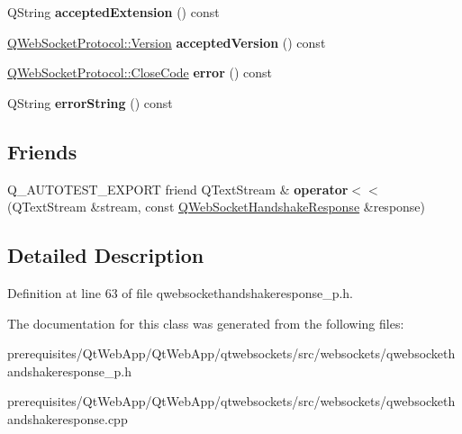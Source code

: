 \begin{DoxyCompactItemize}
Q\+String {\bfseries accepted\+Extension} () const
\item 
\mbox{\label{class_q_web_socket_handshake_response_adb698b5e0072760d49c9b8ee8c89b75c}} 
\mbox{\hyperlink{namespace_q_web_socket_protocol_ad53f2684577effe0a517eadb48714df3}{Q\+Web\+Socket\+Protocol\+::\+Version}} {\bfseries accepted\+Version} () const
\item 
\mbox{\label{class_q_web_socket_handshake_response_a0c9c739fba884d8b31b8d5c88ea2beec}} 
\mbox{\hyperlink{namespace_q_web_socket_protocol_a9f236676f594451d8d723f260b71028c}{Q\+Web\+Socket\+Protocol\+::\+Close\+Code}} {\bfseries error} () const
\item 
\mbox{\label{class_q_web_socket_handshake_response_a807a9235ade54a4c28b7bea45a1fa463}} 
Q\+String {\bfseries error\+String} () const
\end{DoxyCompactItemize}
\subsection*{Friends}
\begin{DoxyCompactItemize}
\item 
\mbox{\label{class_q_web_socket_handshake_response_a8b2b358b0fd11d33e7c340d4669d85d3}} 
Q\+\_\+\+A\+U\+T\+O\+T\+E\+S\+T\+\_\+\+E\+X\+P\+O\+RT friend Q\+Text\+Stream \& {\bfseries operator$<$$<$} (Q\+Text\+Stream \&stream, const \mbox{\hyperlink{class_q_web_socket_handshake_response}{Q\+Web\+Socket\+Handshake\+Response}} \&response)
\end{DoxyCompactItemize}


\subsection{Detailed Description}


Definition at line 63 of file qwebsockethandshakeresponse\+\_\+p.\+h.



The documentation for this class was generated from the following files\+:\begin{DoxyCompactItemize}
\item 
prerequisites/\+Qt\+Web\+App/\+Qt\+Web\+App/qtwebsockets/src/websockets/qwebsockethandshakeresponse\+\_\+p.\+h\item 
prerequisites/\+Qt\+Web\+App/\+Qt\+Web\+App/qtwebsockets/src/websockets/qwebsockethandshakeresponse.\+cpp\end{DoxyCompactItemize}
